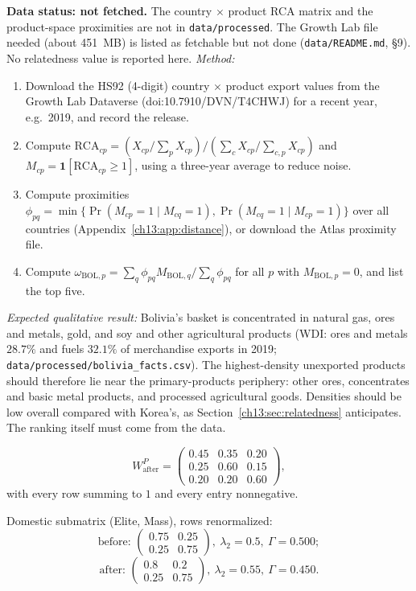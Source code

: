 \documentclass[../solutions_manual.tex]{subfiles}
\begin{document}
 \textbf{Data status: not fetched.} The country $\times$ product RCA matrix and the product-space proximities are not in \texttt{data/processed}. The Growth Lab file needed (about 451~MB) is listed as fetchable but not done (\texttt{data/README.md}, \S9). No relatedness value is reported here. \emph{Method:}
\begin{enumerate}
\item Download the HS92 (4-digit) country $\times$ product export values from the Growth Lab Dataverse (doi:10.7910/DVN/T4CHWJ) for a recent year, e.g.\ 2019, and record the release.
\item Compute $\text{RCA}_{cp} = (X_{cp}/\sum_p X_{cp})/(\sum_c X_{cp}/\sum_{c,p}X_{cp})$ and $M_{cp} = \mathbf{1}[\text{RCA}_{cp} \ge 1]$, using a three-year average to reduce noise.
\item Compute proximities $\phi_{pq} = \min\{\Pr(M_{cp} = 1 \mid M_{cq} = 1), \Pr(M_{cq} = 1 \mid M_{cp} = 1)\}$ over all countries (Appendix~\ref{ch13:app:distance}), or download the Atlas proximity file.
\item Compute $\omega_{\text{BOL},p} = \sum_q\phi_{pq}M_{\text{BOL},q}/\sum_q\phi_{pq}$ for all $p$ with $M_{\text{BOL},p} = 0$, and list the top five.
\end{enumerate}
\emph{Expected qualitative result:} Bolivia's basket is concentrated in natural gas, ores and metals, gold, and soy and other agricultural products (WDI: ores and metals $28.7\%$ and fuels $32.1\%$ of merchandise exports in 2019; \nolinkurl{data/processed/bolivia_facts.csv}). The highest-density unexported products should therefore lie near the primary-products periphery: other ores, concentrates and basic metal products, and processed agricultural goods. Densities should be low overall compared with Korea's, as Section~\ref{ch13:sec:relatedness} anticipates. The ranking itself must come from the data.

\[
W^P_{\text{after}} = \begin{pmatrix} 0.45 & 0.35 & 0.20 \\ 0.25 & 0.60 & 0.15 \\ 0.20 & 0.20 & 0.60 \end{pmatrix},
\]
with every row summing to $1$ and every entry nonnegative.

 Domestic submatrix (Elite, Mass), rows renormalized:
\[
\text{before: } \begin{pmatrix} 0.75 & 0.25 \\ 0.25 & 0.75 \end{pmatrix},\ \lambda_2 = 0.5,\ \Gamma = 0.500;
\]
\[
\text{after: } \begin{pmatrix} 0.8 & 0.2 \\ 0.25 & 0.75 \end{pmatrix},\ \lambda_2 = 0.55,\ \Gamma = 0.450 .
\]
\end{document}
